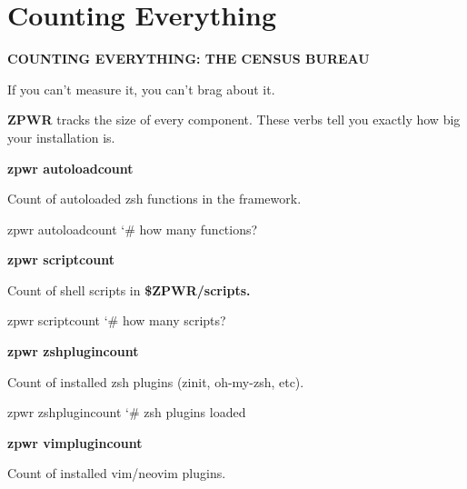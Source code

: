 \documentclass[11pt,a4paper,twoside]{book}
\begin{document}
\section{Counting Everything}


\vspace{10pt}
{\large\bfseries\color{neoncyan} COUNTING EVERYTHING: THE CENSUS BUREAU}\vspace{6pt}

If you can't measure it, you can't brag about it.

\textbf{ZPWR} tracks the size of every component. These verbs tell you exactly how big your installation is.


\vspace{12pt}
{\bfseries\color{neonyellow} zpwr autoloadcount}\vspace{4pt}

Count of autoloaded zsh functions in the framework.

\begin{codebox}
\color{neongreen}zpwr autoloadcount           {\char`\#} how many functions?\\
\end{codebox}


\vspace{12pt}
{\bfseries\color{neonyellow} zpwr scriptcount}\vspace{4pt}

Count of shell scripts in \textbf{\$ZPWR/scripts.}

\begin{codebox}
\color{neongreen}zpwr scriptcount             {\char`\#} how many scripts?\\
\end{codebox}


\vspace{12pt}
{\bfseries\color{neonyellow} zpwr zshplugincount}\vspace{4pt}

Count of installed zsh plugins (zinit, oh-my-zsh, etc).

\begin{codebox}
\color{neongreen}zpwr zshplugincount          {\char`\#} zsh plugins loaded\\
\end{codebox}


\vspace{12pt}
{\bfseries\color{neonyellow} zpwr vimplugincount}\vspace{4pt}

Count of installed vim/neovim plugins.
\end{document}
